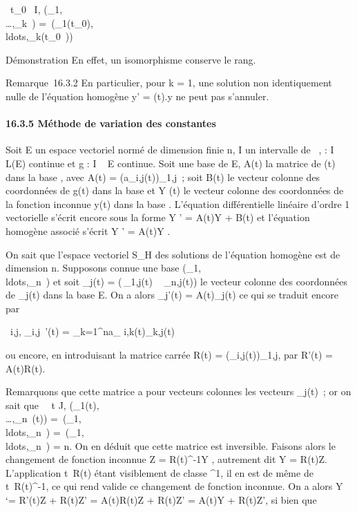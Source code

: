 \documentclass[]{article}
\begin{document}
\forall~t_0~ \in I,
\mathrmrg(\phi_1,\\\ldots,\phi_k~)
=\
\mathrmrg(\phi_1(t_0),\\ldots,\phi_k(t_0~))

Démonstration En effet, un isomorphisme conserve le rang.

Remarque~16.3.2 En particulier, pour k = 1, une solution non
identiquement nulle de l'équation homogène y' = \ell(t).y ne peut pas
s'annuler.

\paragraph{16.3.5 Méthode de variation des constantes}

Soit E un espace vectoriel normé de dimension finie n, I un intervalle
de \mathbb{R}~, \ell : I \rightarrow~ L(E) continue et g : I \rightarrow~ E continue. Soit  une base de E,
A(t) la matrice de \ell(t) dans la base , avec A(t) =
(a_i,j(t))_1\leqi,j\leqn~; soit B(t) le vecteur colonne des
coordonnées de g(t) dans la base  et Y (t) le vecteur colonne des
coordonnées de la fonction inconnue y(t) dans la base \mathcal{E}. L'équation
différentielle linéaire d'ordre 1 vectorielle s'écrit encore sous la
forme Y ' = A(t)Y + B(t) et l'équation homogène associé s'écrit Y ' =
A(t)Y .

On sait que l'espace vectoriel S_H des solutions de l'équation
homogène est de dimension n. Supposons connue une base
(\phi_1,\\ldots,\phi_n~)
et soit \Phi_j(t) = \left
(\matrix\,\phi_1,j(t)
\cr \⋮~
\cr \phi_n,j(t)\right ) le vecteur
colonne des coordonnées de \phi_j(t) dans la base E. On a alors
\Phi_j'(t) = A(t)\Phi_j(t) ce qui se traduit encore par

\forall~i,j, \phi_i,j~'(t) =
\sum _k=1^na_
i,k(t)\psi_k,j(t)

ou encore, en introduisant la matrice carrée R(t) =
(\psi_i,j(t))_1\leqi,j\leqn, par R'(t) = A(t)R(t).

Remarquons que cette matrice a pour vecteurs colonnes les vecteurs
\Phi_j(t)~; or on sait que \forall~~t \in J,
\mathrmrg(\Phi_1(t),\\\ldots,\Phi_n~(t))
=\
\mathrmrg(\Phi_1,\\ldots,\Phi_n~)
=\
\mathrmrg(\phi_1,\\ldots,\phi_n~)
= n. On en déduit que cette matrice est inversible. Faisons alors le
changement de fonction inconnue Z = R(t)^-1Y , autrement dit
Y = R(t)Z. L'application t\mapsto~R(t) étant
visiblement de classe \mathcal{C}^1, il en est de même de
t\mapsto~R(t)^-1, ce qui rend valide ce
changement de fonction inconnue. On a alors Y `= R'(t)Z + R(t)Z' =
A(t)R(t)Z + R(t)Z' = A(t)Y + R(t)Z', si bien que
\end{document}
